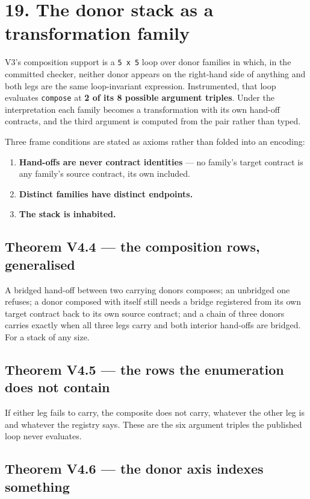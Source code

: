 \section{19. The donor stack as a transformation family}

V3's composition support is a \texttt{5 x 5} loop over donor families in which, in the
committed checker, neither donor appears on the right-hand side of anything and
both legs are the same loop-invariant expression. Instrumented, that loop
evaluates \texttt{compose} at \textbf{2 of its 8 possible argument triples}. Under the
interpretation each family becomes a transformation with its own hand-off
contracts, and the third argument is computed from the pair rather than typed.

Three frame conditions are stated as axioms rather than folded into an encoding:

\begin{enumerate}
  \item \textbf{Hand-offs are never contract identities} --- no family's target contract is
    any family's source contract, its own included.
  \item \textbf{Distinct families have distinct endpoints.}
  \item \textbf{The stack is inhabited.}
\end{enumerate}

\subsection{Theorem V4.4 --- the composition rows, generalised}

A bridged hand-off between two carrying donors composes; an unbridged one
refuses; a donor composed with itself still needs a bridge registered from its
own target contract back to its own source contract; and a chain of three donors
carries exactly when all three legs carry and both interior hand-offs are
bridged. For a stack of any size.

\subsection{Theorem V4.5 --- the rows the enumeration does not contain}

If either leg fails to carry, the composite does not carry, whatever the other
leg is and whatever the registry says. These are the six argument triples the
published loop never evaluates.

\subsection{Theorem V4.6 --- the donor axis indexes something}

